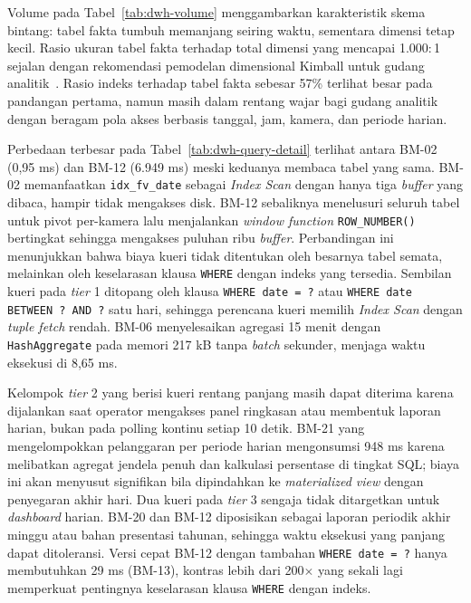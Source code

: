 Volume pada Tabel~\ref{tab:dwh-volume} menggambarkan karakteristik skema bintang: tabel fakta tumbuh memanjang seiring waktu, sementara dimensi tetap kecil. Rasio ukuran tabel fakta terhadap total dimensi yang mencapai 1.000$:$1 sejalan dengan rekomendasi pemodelan dimensional Kimball untuk gudang analitik~\cite{kimball2013dwtoolkit}. Rasio indeks terhadap tabel fakta sebesar 57\% terlihat besar pada pandangan pertama, namun masih dalam rentang wajar bagi gudang analitik dengan beragam pola akses berbasis tanggal, jam, kamera, dan periode harian.

Perbedaan terbesar pada Tabel~\ref{tab:dwh-query-detail} terlihat antara BM-02 (0,95 ms) dan BM-12 (6.949 ms) meski keduanya membaca tabel yang sama. BM-02 memanfaatkan \texttt{idx\_fv\_date} sebagai \textit{Index Scan} dengan hanya tiga \textit{buffer} yang dibaca, hampir tidak mengakses disk. BM-12 sebaliknya menelusuri seluruh tabel untuk pivot per-kamera lalu menjalankan \textit{window function} \texttt{ROW\_NUMBER()} bertingkat sehingga mengakses puluhan ribu \textit{buffer}. Perbandingan ini menunjukkan bahwa biaya kueri tidak ditentukan oleh besarnya tabel semata, melainkan oleh keselarasan klausa \texttt{WHERE} dengan indeks yang tersedia. Sembilan kueri pada \textit{tier} 1 ditopang oleh klausa \texttt{WHERE date = ?} atau \texttt{WHERE date BETWEEN ? AND ?} satu hari, sehingga perencana kueri memilih \textit{Index Scan} dengan \textit{tuple fetch} rendah. BM-06 menyelesaikan agregasi 15 menit dengan \texttt{HashAggregate} pada memori 217 kB tanpa \textit{batch} sekunder, menjaga waktu eksekusi di 8,65 ms.

Kelompok \textit{tier} 2 yang berisi kueri rentang panjang masih dapat diterima karena dijalankan saat operator mengakses panel ringkasan atau membentuk laporan harian, bukan pada polling kontinu setiap 10 detik. BM-21 yang mengelompokkan pelanggaran per periode harian mengonsumsi 948 ms karena melibatkan agregat jendela penuh dan kalkulasi persentase di tingkat SQL; biaya ini akan menyusut signifikan bila dipindahkan ke \textit{materialized view} dengan penyegaran akhir hari. Dua kueri pada \textit{tier} 3 sengaja tidak ditargetkan untuk \textit{dashboard} harian. BM-20 dan BM-12 diposisikan sebagai laporan periodik akhir minggu atau bahan presentasi tahunan, sehingga waktu eksekusi yang panjang dapat ditoleransi. Versi cepat BM-12 dengan tambahan \texttt{WHERE date = ?} hanya membutuhkan 29 ms (BM-13), kontras lebih dari 200$\times$ yang sekali lagi memperkuat pentingnya keselarasan klausa \texttt{WHERE} dengan indeks.

